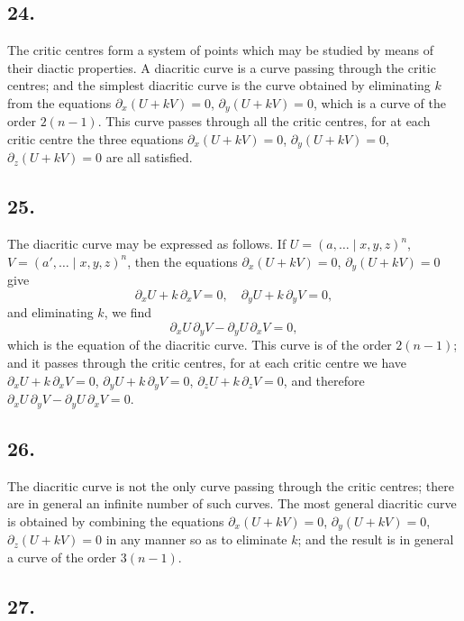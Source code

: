 \documentclass[11pt,a4paper]{article}
\theoremstyle{definition}
\begin{document}
\newpage
\subsection*{24.}

The critic centres form a system of points which may be studied by means of their
diactic properties. A diacritic curve is a curve passing through the critic centres; and
the simplest diacritic curve is the curve obtained by eliminating $k$ from the equations
$\partial_{x}(U + kV) = 0$, $\partial_{y}(U + kV) = 0$, which is a curve of the order $2(n - 1)$. This curve passes
through all the critic centres, for at each critic centre the three equations $\partial_{x}(U + kV) = 0$,
$\partial_{y}(U + kV) = 0$, $\partial_{z}(U + kV) = 0$ are all satisfied.

\subsection*{25.}

The diacritic curve may be expressed as follows. If $U = (a, \ldots \mid x, y, z)^{n}$,
$V = (a', \ldots \mid x, y, z)^{n}$, then the equations $\partial_{x}(U + kV) = 0$, $\partial_{y}(U + kV) = 0$ give
\[
\partial_{x}U + k\,\partial_{x}V = 0,\quad \partial_{y}U + k\,\partial_{y}V = 0,
\]
and eliminating $k$, we find
\[
\partial_{x}U\,\partial_{y}V - \partial_{y}U\,\partial_{x}V = 0,
\]
which is the equation of the diacritic curve. This curve is of the order $2(n - 1)$; and it
passes through the critic centres, for at each critic centre we have $\partial_{x}U + k\,\partial_{x}V = 0$,
$\partial_{y}U + k\,\partial_{y}V = 0$, $\partial_{z}U + k\,\partial_{z}V = 0$, and therefore $\partial_{x}U\,\partial_{y}V - \partial_{y}U\,\partial_{x}V = 0$.

\subsection*{26.}

The diacritic curve is not the only curve passing through the critic centres; there are
in general an infinite number of such curves. The most general diacritic curve is obtained
by combining the equations $\partial_{x}(U + kV) = 0$, $\partial_{y}(U + kV) = 0$, $\partial_{z}(U + kV) = 0$ in any manner
so as to eliminate $k$; and the result is in general a curve of the order $3(n - 1)$.

\newpage
\subsection*{27.}
\end{document}
